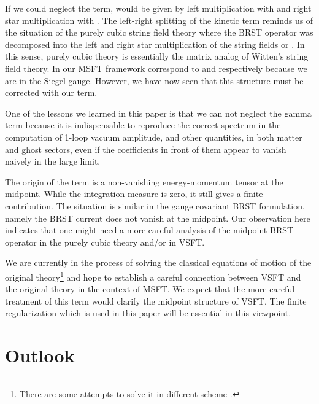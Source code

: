 \documentclass[a4paper,11pt]{article}
\begin{document}
If we could neglect the \myHighlight{$\gamma $}\coordHE{} term, \coordHE{} would be given by
left \myHighlight{$\star $}\coordHE{} multiplication with \coordHE{}
and right star multiplication with \coordHE{}.
The left-right splitting of the kinetic term reminds us of the
situation of the purely cubic string field theory \cite{PSFT}
where the BRST operator \coordHE{} was decomposed into the left and
right star multiplication of the string fields \coordHE{} or \coordHE{}.
In this sense, purely cubic theory
 is essentially the matrix analog of Witten's string
field theory. In our MSFT framework \coordHE{} correspond to
\coordHE{} and \coordHE{} respectively because we are in the Siegel
gauge. However, we have now seen that this structure must be
corrected with our \myHighlight{$\gamma$}\coordHE{} term.

One of the lessons we learned in this paper is that we can not
neglect the gamma term because it is indispensable to reproduce
the correct spectrum in the computation of 1-loop vacuum
amplitude, and other quantities, in both matter and ghost sectors,
even if the coefficients in front of them appear to vanish naively
in the large \coordHE{} limit.

The origin of the \myHighlight{$\gamma$}\coordHE{} term is a non-vanishing energy-momentum
tensor at the midpoint.  While the integration measure is zero, it
still gives a finite contribution. The situation is similar in the
gauge covariant BRST formulation, namely the BRST current does not
vanish at the midpoint. Our observation here indicates that one
might need a more careful analysis of the midpoint BRST operator
in the purely cubic theory and/or in VSFT.

We are currently in the process of solving the classical equations of
motion of the original theory\footnote{%
There are some attempts to solve it in different scheme
\cite{solution}.} and hope to establish a careful connection
between VSFT and the original theory in the context of MSFT. We
expect that the more careful treatment of this term would clarify
the midpoint structure of VSFT. The finite \coordHE{} regularization
which is used in this paper will be essential in this viewpoint.

\section{Outlook}
\end{document}
